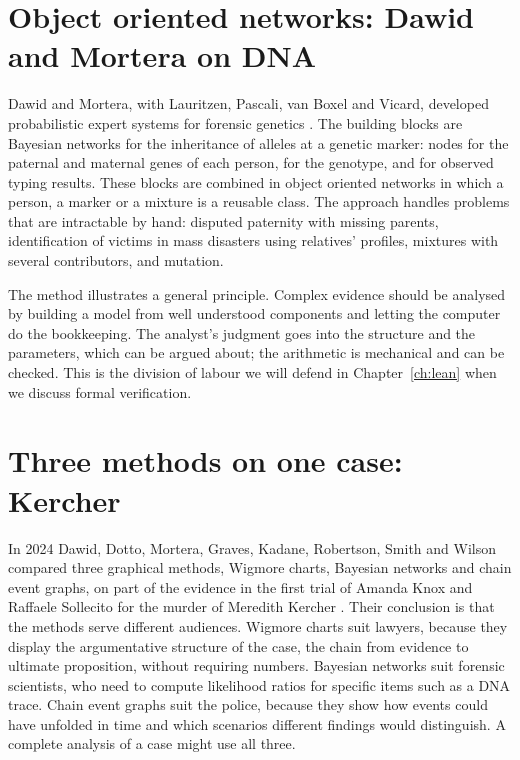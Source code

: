 \section{Object oriented networks: Dawid and Mortera on DNA}

Dawid and Mortera, with Lauritzen, Pascali, van Boxel and Vicard, developed probabilistic expert systems for forensic genetics \citep{dawid2002pes,mortera2003,dawid2007oobn}. The building blocks are Bayesian networks for the inheritance of alleles at a genetic marker: nodes for the paternal and maternal genes of each person, for the genotype, and for observed typing results. These blocks are combined in object oriented networks in which a person, a marker or a mixture is a reusable class. The approach handles problems that are intractable by hand: disputed paternity with missing parents, identification of victims in mass disasters using relatives' profiles, mixtures with several contributors, and mutation.

The method illustrates a general principle. Complex evidence should be analysed by building a model from well understood components and letting the computer do the bookkeeping. The analyst's judgment goes into the structure and the parameters, which can be argued about; the arithmetic is mechanical and can be checked. This is the division of labour we will defend in Chapter~\ref{ch:lean} when we discuss formal verification.

\section{Three methods on one case: Kercher}

In 2024 Dawid, Dotto, Mortera, Graves, Kadane, Robertson, Smith and Wilson compared three graphical methods, Wigmore charts, Bayesian networks and chain event graphs, on part of the evidence in the first trial of Amanda Knox and Raffaele Sollecito for the murder of Meredith Kercher \citep{dawid2024kercher}. Their conclusion is that the methods serve different audiences. Wigmore charts suit lawyers, because they display the argumentative structure of the case, the chain from evidence to ultimate proposition, without requiring numbers. Bayesian networks suit forensic scientists, who need to compute likelihood ratios for specific items such as a DNA trace. Chain event graphs suit the police, because they show how events could have unfolded in time and which scenarios different findings would distinguish. A complete analysis of a case might use all three.

